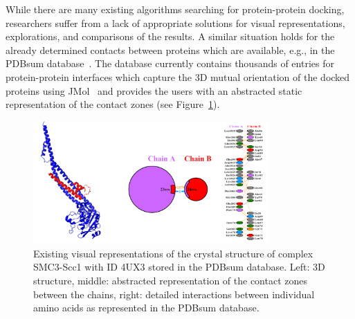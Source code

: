 \documentclass[11pt,a4paper,titlepage,oneside,onecolumn]{article}
\begin{document}
While there are many existing algorithms searching for protein-protein docking, researchers suffer from a lack of appropriate solutions for visual representations, explorations, and comparisons of the results. 
A similar situation holds for the already determined contacts between proteins which are available, e.g., in the PDBsum database~\cite{pdbsum}.
The database currently contains thousands of entries for protein-protein interfaces which capture the 3D mutual orientation of the docked proteins using JMol~\cite{jmol} and provides the users with an abstracted static representation of the contact zones (see Figure~\ref{fig:pdbsum}).

\setlength\intextsep{0pt}
\begin{figure}[bt]
  \vspace{-5mm}
  \centering
  \includegraphics[width=0.8\textwidth]{pics/pdbsum3.png}
  \vspace{-5mm}
	\caption{Existing visual representations of the crystal structure of complex SMC3-Scc1 with ID 4UX3 stored in the PDBsum database. Left: 3D structure, middle: abstracted representation of the contact zones between the chains, right: detailed interactions between individual amino acids as represented in the PDBsum database.}
  \label{fig:pdbsum}
\end{figure}
\end{document}
